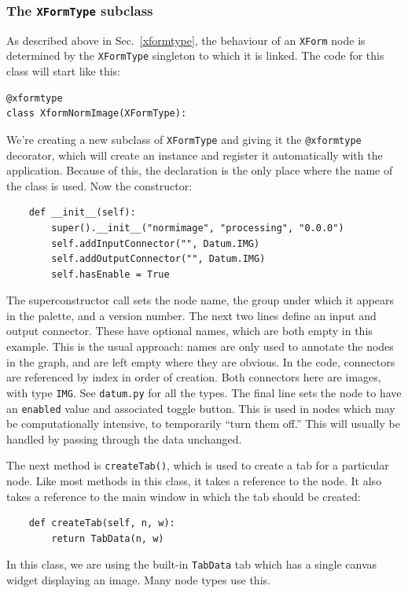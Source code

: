 \subsubsection{The \texttt{XFormType} subclass}
As described above in Sec.~\ref{xformtype}, the behaviour of an \texttt{XForm} node is determined
by the \texttt{XFormType} singleton to which it is linked. The code for this class will start like this:
\begin{lstlisting}
@xformtype
class XformNormImage(XFormType):
\end{lstlisting}
We're creating a new subclass of \texttt{XFormType} and giving it the
\texttt{@xformtype} decorator, which will create an instance and register it
automatically with the application. Because of this, the declaration is the
only place where the name of the class is used. Now the constructor:
\begin{lstlisting}
    def __init__(self):
        super().__init__("normimage", "processing", "0.0.0")
        self.addInputConnector("", Datum.IMG)
        self.addOutputConnector("", Datum.IMG)
        self.hasEnable = True
\end{lstlisting}
The superconstructor call sets the node name, the group under which it appears
in the palette, and a version number. The next two lines define an input and
output connector. These have optional names, which are both empty in this
example. This is the usual approach: names are only used to annotate the nodes
in the graph, and are left empty where they are obvious. In the code,
connectors are referenced by index in order of creation. Both connectors here
are images, with type \texttt{IMG}. See \texttt{datum.py} for all the
types. The final line sets the node to have an \texttt{enabled} value and
associated toggle button. This is used in nodes which may be computationally
intensive, to temporarily ``turn them off.'' This will usually be handled by
passing through the data unchanged.

The next method is \texttt{createTab()}, which is used to create a tab for a
particular node. Like most methods in this class, it takes a reference to the
node. It also takes a reference to the main window in which the tab should be
created:
\begin{lstlisting}
    def createTab(self, n, w):
        return TabData(n, w)
\end{lstlisting}
In this class, we are using the built-in \texttt{TabData} tab which has a single canvas widget
displaying an image. Many node types use this.

